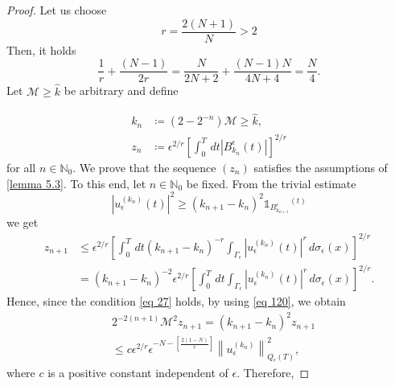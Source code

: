 \begin{proof} Let us choose
$$
    r=\frac{2(N+1)}{N}>2
$$
Then, it holds
\begin{equation}
    \frac{1}{r}+\frac{(N-1)}{2 r}=\frac{N}{2N+2}+\frac{(N-1)N}{4N+4}=\frac{N}{4}.
\label{eq 27}
\end{equation}
Let $\mathcal{M} \geq \hat{k}$ be arbitrary and define


\begin{align}
    k_{n} &\coloneqq \left(2-2^{-n}\right) \mathcal{M} \geq \hat{k},  \nonumber \\
    z_{n} &\coloneqq \epsilon^{2 / r}\left[\int_{0}^{T} \, d  t\left|B_{k_{n}}^{\epsilon}(t)\right|\right]^{2 / r}
\label{eq 28}
\end{align}
for all $n \in \mathbb{N}_{0}$. We prove that the sequence $\left(z_{n}\right)$ satisfies the assumptions of \eqref{lemma 5.3}. To this end, let $n \in \mathbb{N}_{0}$ be fixed. From the trivial estimate
\begin{equation}
 \left|u_{\epsilon}^{\left(k_{n}\right)}(t)\right|^{2} \geq\left(k_{n+1}-k_{n}\right)^{2} \mathds{1}_{B_{k_{n+1}}^{\epsilon}}{ }^{(t)}
\label{eq 29}\end{equation}
we get
\begin{equation}
    \begin{aligned}
        z_{n+1} & \leq \epsilon^{2 / r}\left[\int_{0}^{T} \, d  t\left(k_{n+1}-k_{n}\right)^{-r} \int_{\Gamma_{\epsilon}}\left|u_{\epsilon}^{\left(k_{n}\right)}(t)\right|^{r} \, d  \sigma_{\epsilon}(x)\right]^{2 / r} \\
        &=\left(k_{n+1}-k_{n}\right)^{-2} \epsilon^{2 / r}\left[\int_{0}^{T} \, d  t \int_{\Gamma_{\epsilon}}\left|u_{\epsilon}^{\left(k_{n}\right)}(t)\right|^{r} \, d  \sigma_{\epsilon}(x)\right]^{2 / r}.
    \end{aligned}
\label{eq 30}
\end{equation}
Hence, since the condition \eqref{eq 27} holds, by using \eqref{eq 120}, we obtain
\begin{equation}
    \begin{aligned}
        &2^{-2(n+1)} \mathcal{M}^{2} z_{n+1}=\left(k_{n+1}-k_{n}\right)^{2} z_{n+1} \\
        &\leq c \epsilon^{2 / r} \epsilon^{-N-\left[\frac{2(1-N)}{r}\right]}\left\|u_{\epsilon}^{\left(k_{n}\right)}\right\|_{Q_{\epsilon}(T)}^{2},
    \end{aligned}
\label{eq 31}
\end{equation}
where $c$ is a positive constant independent of $\epsilon$. Therefore,

\end{proof}

